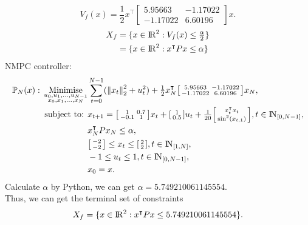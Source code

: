 \documentclass[a4paper,11pt,reqno]{amsart}
\newcommand{\R}{{\rm I\!R}}
\newcommand{\N}{{\rm I\!N}}
\newcommand{\tran}{\intercal}
\begin{document}
\begin{equation}
    V_f(x)=\frac{1}{2}x^{\tran}
    \begin{bmatrix}
        5.95663&-1.17022\\
        -1.17022&6.60196
    \end{bmatrix}x.
\end{equation}
\begin{align}
    X_f&=\{x\in\R^2:V_f(x)\leq\tfrac{\alpha}{2}\}
    \notag\\
    &=\{x\in\R^2:x^{\tran}Px\leq\alpha\}
\end{align}
NMPC controller:
\begin{subequations}
    \begin{align}
        \mathbb{P}_N(x){}:{}
        \operatorname*{Minimise}_{\substack{u_0,u_1,\ldots,u_{N-1}\\ x_0,x_1,\ldots,x_N}}&\sum_{t=0}^{N-1} (\left\lVert x_t\right\rVert ^2_2+u_t^2) + \tfrac{1}{2}x_N^{\tran}\begin{bsmallmatrix}5.95663&-1.17022\\-1.17022&6.60196\end{bsmallmatrix}x_N,
        \\
        \text{subject to: }& x_{t+1} = 
        \begin{bsmallmatrix}
            1&0.7\\
            -0.1&1
        \end{bsmallmatrix}x_t + 
        \begin{bsmallmatrix}
            1\\
            0.5
        \end{bsmallmatrix}u_t+
        \tfrac{1}{20}
        \begin{bsmallmatrix}
            x_t^{\tran}x_t\\
            \sin^2(x_{t,1})
        \end{bsmallmatrix}, t\in\N_{[0,N-1]},
        \\
        &x_N^{\tran} P x_N \leq \alpha,
        \\
        &\begin{bsmallmatrix}
            -2\\
            -2
        \end{bsmallmatrix} 
        \leq x_t \leq 
        \begin{bsmallmatrix}
            2\\
            2
        \end{bsmallmatrix}, t\in\N_{[1,N]},
        \\
        &-1 \leq u_t \leq 1, t\in\N_{[0,N-1]},
        \\
        & x_0 = x.
    \end{align}
\end{subequations}
Calculate $\alpha$ by Python, we can get $\alpha=5.749210061145554$.
\\
Thus, we can get the terminal set of constraints
\begin{equation}
    X_f=\{x\in\R^2:x^{\tran}Px\leq 5.749210061145554\}.
\end{equation}



\end{document}
